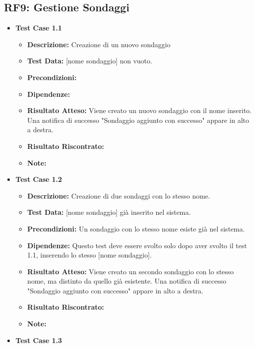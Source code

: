     \subsection{RF9: Gestione Sondaggi}
        \begin{itemize}
            \item \textbf{Test Case 1.1}
                \begin{itemize}
                    \item \textbf{Descrizione:} Creazione di un nuovo sondaggio
                    \item \textbf{Test Data:} [nome sondaggio] non vuoto.
                    \item \textbf{Precondizioni:}
                    \item \textbf{Dipendenze:}
                    \item \textbf{Risultato Atteso:} Viene creato un nuovo sondaggio con il nome inserito. Una notifica di successo "Sondaggio aggiunto con successo" appare in alto a destra.
                    \item \textbf{Risultato Riscontrato:}
                    \item \textbf{Note:}
                \end{itemize}
            \item \textbf{Test Case 1.2}
                \begin{itemize}
                    \item \textbf{Descrizione:} Creazione di due sondaggi con lo stesso nome.
                    \item \textbf{Test Data:} [nome sondaggio] già inserito nel sistema.
                    \item \textbf{Precondizioni:} Un sondaggio con lo stesso nome esiste già nel sistema.
                    \item \textbf{Dipendenze:} Questo test deve essere svolto solo dopo aver svolto il test 1.1, inserendo lo stesso [nome sondaggio].
                    \item \textbf{Risultato Atteso:} Viene creato un secondo sondaggio con lo stesso nome, ma distinto da quello già esistente. Una notifica di successo "Sondaggio aggiunto con successo" appare in alto a destra.
                    \item \textbf{Risultato Riscontrato:}
                    \item \textbf{Note:}
                \end{itemize}
            \item \textbf{Test Case 1.3}

\end{itemize}
